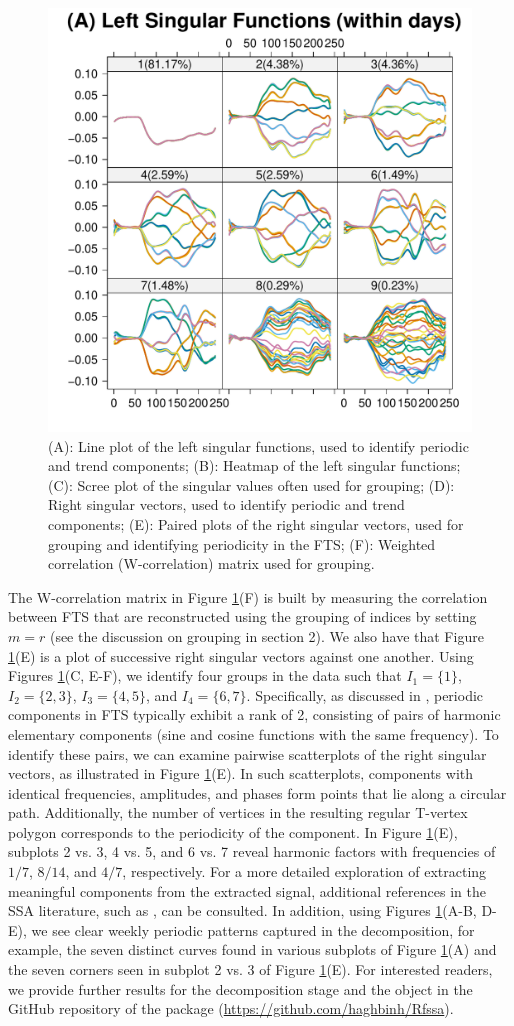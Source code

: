 \begin{figure}[t!]
	\includegraphics[page=6,width=.32\textwidth]{figures/fssa_call.pdf}
	\caption{(A): Line plot of the left singular functions, used to identify 
	periodic and trend components; (B): Heatmap of the left singular functions; (C): 
	Scree plot of the singular values often used for grouping; (D): Right singular 
	vectors, used to identify periodic and trend components; (E): Paired plots of 
	the right singular vectors, used for grouping and identifying periodicity in the 
	FTS; (F): Weighted correlation (W-correlation) matrix used for grouping.}
	\label{fig:call_decomp}
\end{figure}
The W-correlation matrix in Figure \ref{fig:call_decomp}(F) is built by measuring 
the correlation between FTS that are reconstructed using the grouping of indices by 
setting $m=r$ (see the discussion on grouping in section 2). We also have that 
Figure \ref{fig:call_decomp}(E) is a plot of successive right singular vectors 
against one another. Using Figures \ref{fig:call_decomp}(C, E-F), we identify four 
groups in the  data such that $I_{1}=\{1\}$, $I_{2} = \{2,3\}$, 
$I_{3}=\{4,5\}$, and $I_{4}=\{6,7\}$.
Specifically, as discussed in \cite{golyandina2001}, periodic components in FTS typically exhibit a rank of 2, consisting of pairs of harmonic elementary components (sine and cosine functions with the same frequency). To identify these pairs, we can examine pairwise scatterplots of the right singular vectors, as illustrated in Figure \ref{fig:call_decomp}(E). In such scatterplots, components with identical frequencies, amplitudes, and phases form points that lie along a circular path. Additionally, the number of vertices in the resulting regular T-vertex polygon corresponds to the periodicity of the component. In Figure \ref{fig:call_decomp}(E), subplots 2 vs. 3, 4 vs. 5, and 6 vs. 7 reveal harmonic factors with frequencies of $1/7$, $8/14$, and $4/7$, respectively. For a more detailed exploration of extracting meaningful components from the extracted signal, additional references in the SSA literature, such as \cite{golyandina2013}, can be consulted.
In addition, using Figures 
\ref{fig:call_decomp}(A-B, D-E), we see clear weekly periodic patterns captured in 
the decomposition, for example, the seven distinct curves found in various subplots 
of Figure \ref{fig:call_decomp}(A) and the seven corners seen in subplot 2 vs. 3 of 
Figure \ref{fig:call_decomp}(E).
For interested readers, we provide further results for the decomposition stage and the  object in the GitHub repository of the  package (\url{https://github.com/haghbinh/Rfssa}).
